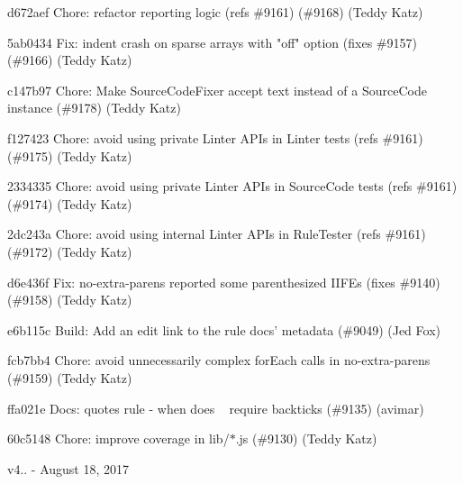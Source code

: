 \begin{DoxyItemize}
\item d672aef Chore\+: refactor reporting logic (refs \#9161) (\#9168) (Teddy Katz)
\item 5ab0434 Fix\+: indent crash on sparse arrays with "{}off"{} option (fixes \#9157) (\#9166) (Teddy Katz)
\item c147b97 Chore\+: Make Source\+Code\+Fixer accept text instead of a Source\+Code instance (\#9178) (Teddy Katz)
\item f127423 Chore\+: avoid using private Linter APIs in Linter tests (refs \#9161) (\#9175) (Teddy Katz)
\item 2334335 Chore\+: avoid using private Linter APIs in Source\+Code tests (refs \#9161) (\#9174) (Teddy Katz)
\item 2dc243a Chore\+: avoid using internal Linter APIs in Rule\+Tester (refs \#9161) (\#9172) (Teddy Katz)
\item d6e436f Fix\+: no-\/extra-\/parens reported some parenthesized IIFEs (fixes \#9140) (\#9158) (Teddy Katz)
\item e6b115c Build\+: Add an edit link to the rule docs’ metadata (\#9049) (Jed Fox)
\item fcb7bb4 Chore\+: avoid unnecessarily complex for\+Each calls in no-\/extra-\/parens (\#9159) (Teddy Katz)
\item ffa021e Docs\+: quotes rule -\/ when does ~\newline
 require backticks (\#9135) (avimar)
\item 60c5148 Chore\+: improve coverage in lib/\texorpdfstring{$\ast$}{*}.js (\#9130) (Teddy Katz)
\end{DoxyItemize}

v4.. -\/ August 18, 2017


